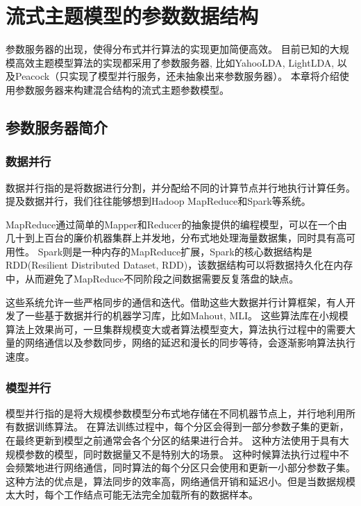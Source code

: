 \chapter{流式主题模型的参数数据结构}
\label{chapter:hybridps}
参数服务器的出现，使得分布式并行算法的实现更加简便高效。
目前已知的大规模高效主题模型算法的实现都采用了参数服务器\cite{li2014scaling}, 比如YahooLDA\cite{ahmed2012scalable}, LightLDA\cite{yuan2015lightlda}, 以及Peacock\cite{li2014scaling}（只实现了模型并行服务，还未抽象出来参数服务器）。
本章将介绍使用参数服务器来构建混合结构的流式主题参数模型。

\section{参数服务器简介}
\subsection{数据并行}
数据并行指的是将数据进行分割，并分配给不同的计算节点并行地执行计算任务。
提及数据并行，我们往往能够想到Hadoop MapReduce和Spark等系统。

MapReduce通过简单的Mapper和Reducer的抽象提供的编程模型，可以在一个由几十到上百台的廉价机器集群上并发地，分布式地处理海量数据集，同时具有高可用性。
Spark则是一种内存的MapReduce扩展，Spark的核心数据结构是RDD(Resilient Distributed Dataset, RDD)，该数据结构可以将数据持久化在内存中，从而避免了MapReduce不同阶段之间数据需要反复落盘的缺点。

这些系统允许一些严格同步的通信和迭代。借助这些大数据并行计算框架，有人开发了一些基于数据并行的机器学习库，比如Mahout\cite{mahout}, MLI\cite{sparks2013mli}。
这些算法库在小规模算法上效果尚可，一旦集群规模变大或者算法模型变大，算法执行过程中的需要大量的网络通信以及参数同步，网络的延迟和漫长的同步等待，会逐渐影响算法执行速度。

\subsection{模型并行}
模型并行指的是将大规模参数模型分布式地存储在不同机器节点上，并行地利用所有数据训练算法。
在算法训练过程中，每个分区会得到一部分参数子集的更新，在最终更新到模型之前通常会各个分区的结果进行合并。
这种方法使用于具有大规模参数的模型，同时数据量又不是特别大的场景。
这种时候算法执行过程中不会频繁地进行网络通信，同时算法的每个分区只会使用和更新一小部分参数子集。这种方法的优点是，算法同步的效率高，网络通信开销和延迟小。但是当数据规模太大时，每个工作结点可能无法完全加载所有的数据样本。

